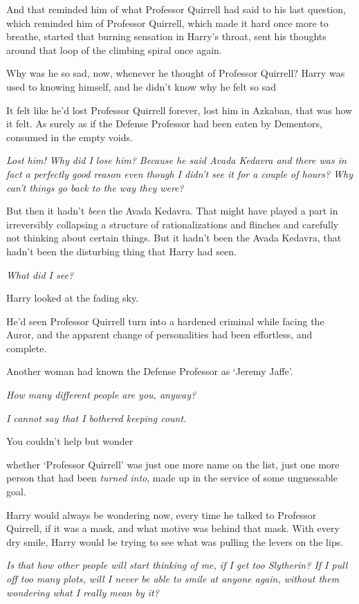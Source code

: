 And that reminded him of what Professor Quirrell had said to his last question,
which reminded him of Professor Quirrell, which made it hard once more to
breathe, started that burning sensation in Harry's throat, sent his thoughts
around that loop of the climbing spiral once again.

Why was he so sad, now, whenever he thought of Professor Quirrell? Harry was
used to knowing himself, and he didn't know why he felt so sad{\el}

It felt like he'd lost Professor Quirrell forever, lost him in Azkaban, that
was how it felt. As surely as if the Defense Professor had been eaten by
Dementors, consumed in the empty voids.

\emph{Lost him! Why did I lose him? Because he said Avada Kedavra and there was
in fact a perfectly good reason even though I didn't see it for a couple of
hours? Why can't things go back to the way they were?}

But then it hadn't \emph{been} the Avada Kedavra. That might have played a part
in irreversibly collapsing a structure of rationalizations and flinches and
carefully not thinking about certain things. But it hadn't been the Avada
Kedavra, that hadn't been the disturbing thing that Harry had seen.

\emph{What did I see{\el}?}

Harry looked at the fading sky.

He'd seen Professor Quirrell turn into a hardened criminal while facing the
Auror, and the apparent change of personalities had been effortless, and
complete.

Another woman had known the Defense Professor as `Jeremy Jaffe'.

\emph{How many different people are you, anyway?}

\emph{I cannot say that I bothered keeping count.}

You couldn't help but wonder{\el}

{\el} whether `Professor Quirrell' was just one more name on the list, just
one more person that had been \emph{turned into}, made up in the service of
some unguessable goal.

Harry would always be wondering now, every time he talked to Professor
Quirrell, if it was a mask, and what motive was behind that mask. With every
dry smile, Harry would be trying to see what was pulling the levers on the lips.

\emph{Is that how other people will start thinking of me, if I get too
Slytherin? If I pull off too many plots, will I never be able to smile at
anyone again, without them wondering what I really mean by it?}

